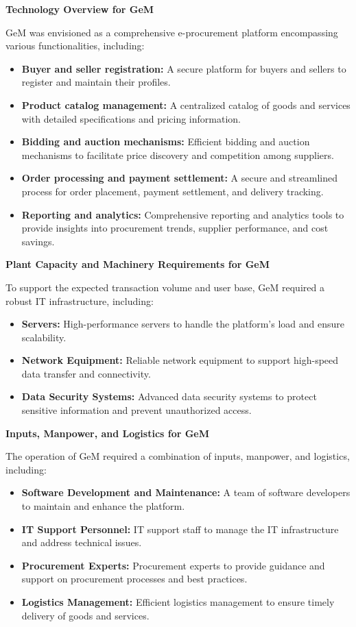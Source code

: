 \textbf{Technology Overview for GeM}

GeM was envisioned as a comprehensive e-procurement platform encompassing various functionalities, including:

\begin{itemize}
    \item \textbf{Buyer and seller registration:} A secure platform for buyers and sellers to register and maintain their profiles.
    \item \textbf{Product catalog management:} A centralized catalog of goods and services with detailed specifications and pricing information.
    \item \textbf{Bidding and auction mechanisms:} Efficient bidding and auction mechanisms to facilitate price discovery and competition among suppliers.
    \item \textbf{Order processing and payment settlement:} A secure and streamlined process for order placement, payment settlement, and delivery tracking.
    \item \textbf{Reporting and analytics:} Comprehensive reporting and analytics tools to provide insights into procurement trends, supplier performance, and cost savings.
\end{itemize}

\textbf{Plant Capacity and Machinery Requirements for GeM}

To support the expected transaction volume and user base, GeM required a robust IT infrastructure, including:

\begin{itemize}
    \item \textbf{Servers:} High-performance servers to handle the platform's load and ensure scalability.
    \item \textbf{Network Equipment:} Reliable network equipment to support high-speed data transfer and connectivity.
    \item \textbf{Data Security Systems:} Advanced data security systems to protect sensitive information and prevent unauthorized access.
\end{itemize}

\textbf{Inputs, Manpower, and Logistics for GeM}

The operation of GeM required a combination of inputs, manpower, and logistics, including:

\begin{itemize}
    \item \textbf{Software Development and Maintenance:} A team of software developers to maintain and enhance the platform.
    \item \textbf{IT Support Personnel:} IT support staff to manage the IT infrastructure and address technical issues.
    \item \textbf{Procurement Experts:} Procurement experts to provide guidance and support on procurement processes and best practices.
    \item \textbf{Logistics Management:} Efficient logistics management to ensure timely delivery of goods and services.
\end{itemize}

